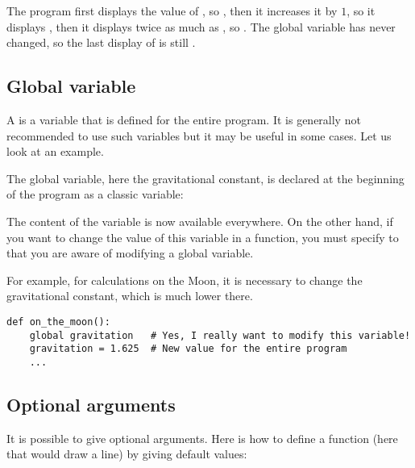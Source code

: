 \documentclass[11pt,class=report,crop=false]{standalone}
\begin{document}

The program first displays the value of , so , then it increases it by $1$, so it displays , then it displays twice as much as , so . The global variable  has never changed, so the last display of  is still .

\subsection{Global variable}

A  is a variable that is defined for the entire program. It is generally not recommended to use such variables but it may be useful in some cases. Let us look at an example.

The global variable, here the gravitational constant, is declared at the beginning of the program as a classic variable: 

The content of the variable  is now available everywhere.
On the other hand, if you want to change the value of this variable in a function, you must specify to \Python{} that you are aware of modifying a global variable.

For example, for calculations on the Moon, it is necessary to change the gravitational constant, which is much lower there.

\begin{lstlisting}
def on_the_moon():
    global gravitation   # Yes, I really want to modify this variable!
    gravitation = 1.625  # New value for the entire program
    ...
\end{lstlisting}

\subsection{Optional arguments}


It is possible to give optional arguments. Here is how to define a function (here that would draw a line) by giving default values:
 
\end{document}
